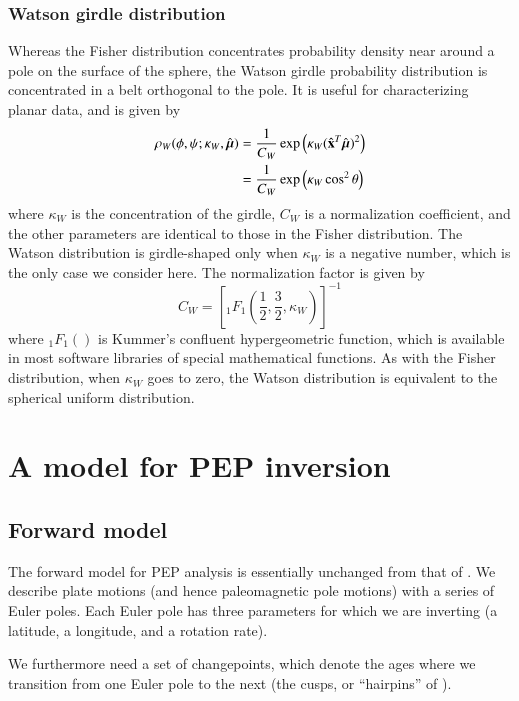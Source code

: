 \documentclass[preprint,12pt,authoryear]{elsarticle}
\newcommand{\mitbf}[1]{\hbox{\mathversion{bold}$#1$}}
\begin{document}
\subsubsection{Watson girdle distribution}
Whereas the Fisher distribution concentrates probability density near around a pole on
the surface of the sphere, the Watson girdle probability distribution is concentrated
in a belt orthogonal to the pole. It is useful for characterizing planar data, and is given by
\begin{equation}
  \begin{aligned}
  \rho_W(\phi, \psi; \kappa_W, \hat{\mitbf{\mu}}) 
  &= \frac{1}{C_W} \exp \left( \kappa_W (\hat{\mathbf{x}}^T \hat{\mitbf{\mu}})^2 \right) \\
  &= \frac{1}{C_W} \exp \left( \kappa_W \cos^2 \theta \right)
  \end{aligned}
\end{equation}
where $\kappa_W$ is the concentration of the girdle, $C_W$ is a normalization coefficient,
and the other parameters are identical to those in the Fisher distribution.
The Watson distribution is girdle-shaped only when $\kappa_W$ is a negative number, 
which is the only case we consider here.
The normalization factor is given by
\begin{equation}
  C_W = \left[ {}_1 F_1 \left( \frac{1}{2}, \frac{3}{2}, \kappa_W \right) \right]^{-1}
\end{equation}
where ${}_1 F_1()$ is Kummer's confluent hypergeometric function, which is available
in most software libraries of special mathematical functions.
As with the Fisher distribution, when $\kappa_W$ goes to zero, 
the Watson distribution is equivalent to the spherical uniform distribution.

\section{A model for PEP inversion}
\label{sec:model}
\subsection{Forward model}
\label{sec:forward_model}
The forward model for PEP analysis is essentially unchanged from that of \citet{gordon1984paleomagnetic}.
We describe plate motions (and hence paleomagnetic pole motions) with a series of Euler poles.
Each Euler pole has three parameters for which we are inverting (a latitude, a longitude, and a rotation rate).

We furthermore need a set of changepoints, which denote the ages where we transition from 
one Euler pole to the next (the cusps, or ``hairpins'' of \citet{irving1972hairpins}).
\end{document}
